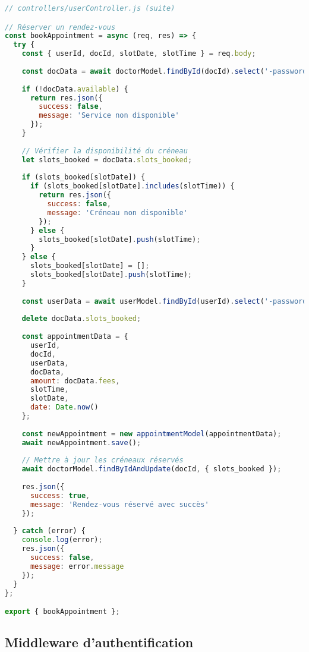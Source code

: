 \begin{lstlisting}[language=JavaScript, caption=Gestion des rendez-vous]
// controllers/userController.js (suite)

// Réserver un rendez-vous
const bookAppointment = async (req, res) => {
  try {
    const { userId, docId, slotDate, slotTime } = req.body;
    
    const docData = await doctorModel.findById(docId).select('-password');
    
    if (!docData.available) {
      return res.json({
        success: false,
        message: 'Service non disponible'
      });
    }
    
    // Vérifier la disponibilité du créneau
    let slots_booked = docData.slots_booked;
    
    if (slots_booked[slotDate]) {
      if (slots_booked[slotDate].includes(slotTime)) {
        return res.json({
          success: false,
          message: 'Créneau non disponible'
        });
      } else {
        slots_booked[slotDate].push(slotTime);
      }
    } else {
      slots_booked[slotDate] = [];
      slots_booked[slotDate].push(slotTime);
    }
    
    const userData = await userModel.findById(userId).select('-password');
    
    delete docData.slots_booked;
    
    const appointmentData = {
      userId,
      docId,
      userData,
      docData,
      amount: docData.fees,
      slotTime,
      slotDate,
      date: Date.now()
    };
    
    const newAppointment = new appointmentModel(appointmentData);
    await newAppointment.save();
    
    // Mettre à jour les créneaux réservés
    await doctorModel.findByIdAndUpdate(docId, { slots_booked });
    
    res.json({
      success: true,
      message: 'Rendez-vous réservé avec succès'
    });
    
  } catch (error) {
    console.log(error);
    res.json({
      success: false,
      message: error.message
    });
  }
};

export { bookAppointment };
\end{lstlisting}

\subsection{Middleware d'authentification}

